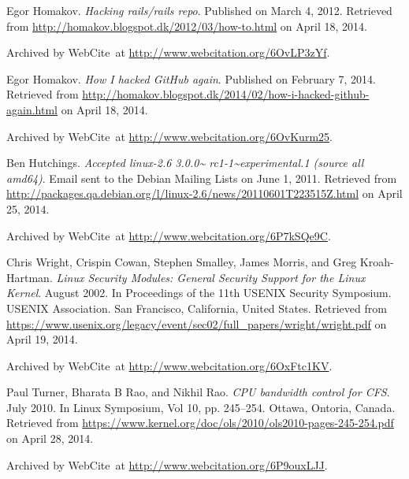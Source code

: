 \begin{thebibliography}{9}
Egor Homakov. \emph{Hacking rails/rails repo}. Published on March 4, 2012.
Retrieved from \url{http://homakov.blogspot.dk/2012/03/how-to.html} on April
18, 2014.

Archived by WebCite\textsuperscript{\textregistered}\ at
\url{http://www.webcitation.org/6OvLP3zYf}.


Egor Homakov. \emph{How I hacked GitHub again}. Published on February 7, 2014.
Retrieved from
\url{http://homakov.blogspot.dk/2014/02/how-i-hacked-github-again.html} on
April 18, 2014.

Archived by WebCite\textsuperscript{\textregistered}\ at
\url{http://www.webcitation.org/6OvKurm25}.


Ben Hutchings. \emph{Accepted linux-2.6 3.0.0\textasciitilde
rc1-1\textasciitilde experimental.1 (source all amd64)}. Email sent to the
Debian Mailing Lists on June 1, 2011.  Retrieved from
\url{http://packages.qa.debian.org/l/linux-2.6/news/20110601T223515Z.html} on
April 25, 2014.

Archived by WebCite\textsuperscript{\textregistered}\ at
\url{http://www.webcitation.org/6P7kSQe9C}.


Chris Wright, Crispin Cowan, Stephen Smalley, James Morris, and Greg
Kroah-Hartman. \emph{Linux Security Modules: General Security Support for the
Linux Kernel}. August 2002. In Proceedings of the 11th USENIX Security
Symposium. USENIX Association. San Francisco, California, United States.
Retrieved from
\url{https://www.usenix.org/legacy/event/sec02/full_papers/wright/wright.pdf}
on April 19, 2014.

Archived by WebCite\textsuperscript{\textregistered}\ at
\url{http://www.webcitation.org/6OxFtc1KV}.


Paul Turner, Bharata B Rao, and Nikhil Rao. \emph{CPU bandwidth control for
CFS}. July 2010. In Linux Symposium, Vol 10, pp. 245--254. Ottawa, Ontoria,
Canada. Retrieved from
\url{https://www.kernel.org/doc/ols/2010/ols2010-pages-245-254.pdf} on April
28, 2014.

Archived by WebCite\textsuperscript{\textregistered}\ at
\url{http://www.webcitation.org/6P9ouxLJJ}.



\end{thebibliography}
